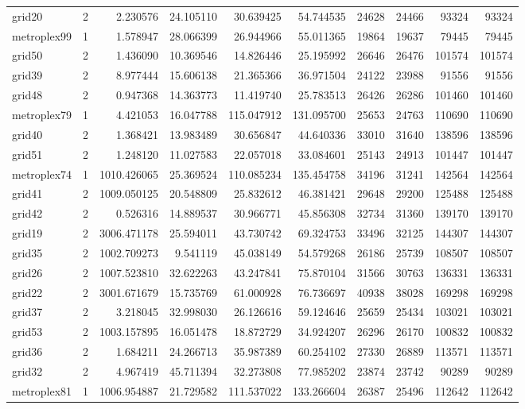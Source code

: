 \begin{longtable}{|l|r|r|r|r|r|r|r|r|r|}
grid20 & 2 & 2.230576 & 24.105110 & 30.639425 & 54.744535 & 24628 & 24466 & 93324 & 93324 \\
metroplex99 & 1 & 1.578947 & 28.066399 & 26.944966 & 55.011365 & 19864 & 19637 & 79445 & 79445 \\
grid50 & 2 & 1.436090 & 10.369546 & 14.826446 & 25.195992 & 26646 & 26476 & 101574 & 101574 \\
grid39 & 2 & 8.977444 & 15.606138 & 21.365366 & 36.971504 & 24122 & 23988 & 91556 & 91556 \\
grid48 & 2 & 0.947368 & 14.363773 & 11.419740 & 25.783513 & 26426 & 26286 & 101460 & 101460 \\
metroplex79 & 1 & 4.421053 & 16.047788 & 115.047912 & 131.095700 & 25653 & 24763 & 110690 & 110690 \\
grid40 & 2 & 1.368421 & 13.983489 & 30.656847 & 44.640336 & 33010 & 31640 & 138596 & 138596 \\
grid51 & 2 & 1.248120 & 11.027583 & 22.057018 & 33.084601 & 25143 & 24913 & 101447 & 101447 \\
metroplex74 & 1 & 1010.426065 & 25.369524 & 110.085234 & 135.454758 & 34196 & 31241 & 142564 & 142564 \\
grid41 & 2 & 1009.050125 & 20.548809 & 25.832612 & 46.381421 & 29648 & 29200 & 125488 & 125488 \\
grid42 & 2 & 0.526316 & 14.889537 & 30.966771 & 45.856308 & 32734 & 31360 & 139170 & 139170 \\
grid19 & 2 & 3006.471178 & 25.594011 & 43.730742 & 69.324753 & 33496 & 32125 & 144307 & 144307 \\
grid35 & 2 & 1002.709273 & 9.541119 & 45.038149 & 54.579268 & 26186 & 25739 & 108507 & 108507 \\
grid26 & 2 & 1007.523810 & 32.622263 & 43.247841 & 75.870104 & 31566 & 30763 & 136331 & 136331 \\
grid22 & 2 & 3001.671679 & 15.735769 & 61.000928 & 76.736697 & 40938 & 38028 & 169298 & 169298 \\
grid37 & 2 & 3.218045 & 32.998030 & 26.126616 & 59.124646 & 25659 & 25434 & 103021 & 103021 \\
grid53 & 2 & 1003.157895 & 16.051478 & 18.872729 & 34.924207 & 26296 & 26170 & 100832 & 100832 \\
grid36 & 2 & 1.684211 & 24.266713 & 35.987389 & 60.254102 & 27330 & 26889 & 113571 & 113571 \\
grid32 & 2 & 4.967419 & 45.711394 & 32.273808 & 77.985202 & 23874 & 23742 & 90289 & 90289 \\
metroplex81 & 1 & 1006.954887 & 21.729582 & 111.537022 & 133.266604 & 26387 & 25496 & 112642 & 112642 \\

\end{longtable}
